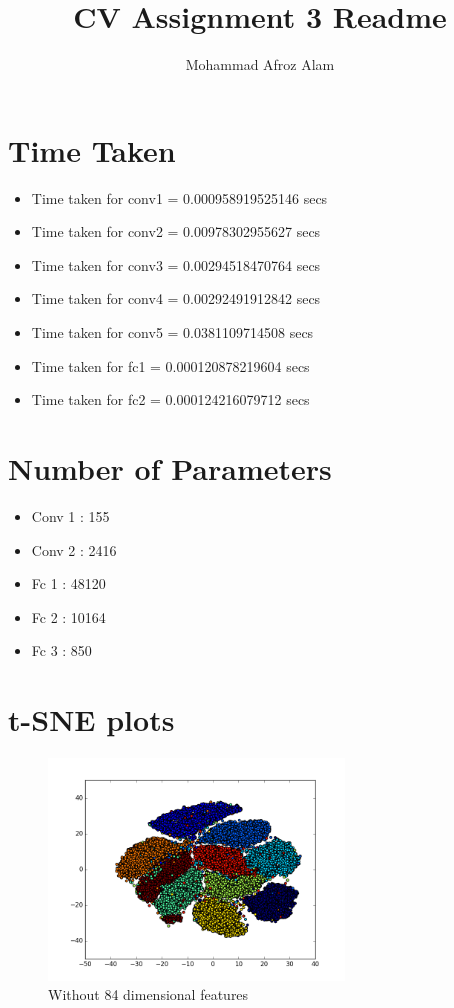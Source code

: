 \documentclass{article}
\author{Mohammad Afroz Alam}
\date{}
\title{CV Assignment 3 Readme}
\begin{document}
\section{Time Taken}
\begin{itemize}
\item Time taken for conv1 = 0.000958919525146 secs
\item Time taken for conv2 = 0.00978302955627 secs
\item Time taken for conv3 = 0.00294518470764 secs
\item Time taken for conv4 = 0.00292491912842 secs
\item Time taken for conv5 = 0.0381109714508 secs
\item Time taken for fc1 = 0.000120878219604 secs
\item Time taken for fc2 = 0.000124216079712 secs
\end{itemize}

\section{Number of Parameters}
\begin{itemize}
\item Conv 1 : 155
\item Conv 2 : 2416
\item Fc 1 : 48120
\item Fc 2 : 10164
\item Fc 3 : 850
\end{itemize}

\section{t-SNE plots}
\begin{figure}[h]
  \centering
  \includegraphics[width=0.7\textwidth]{keras_lenet/scatter_basic.png}
  \caption{Without 84 dimensional features}
  \label{fig:basic}
\end{figure}
\end{document}
